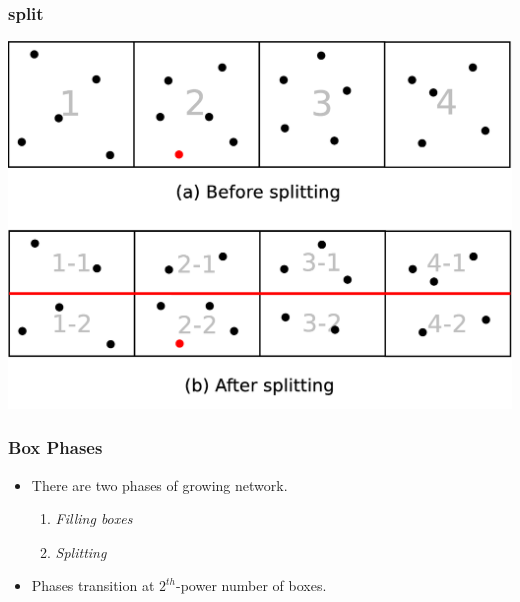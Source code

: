 \documentclass[red]{beamer}
\begin{document}
\begin{frame}
\frametitle{split}
\begin{center}
\includegraphics[scale=0.15]{figs/split.eps}
\end{center}
\end{frame}

\begin{frame}
\frametitle{Box Phases}
\begin{itemize}
\item There are two phases of growing network.
\begin{enumerate}
\item \textit{Filling boxes}
\item \textit{Splitting}
\end{enumerate}
\item Phases transition at $2^{th}$-power number of boxes.
\end{itemize}
\end{frame}
\end{document}
